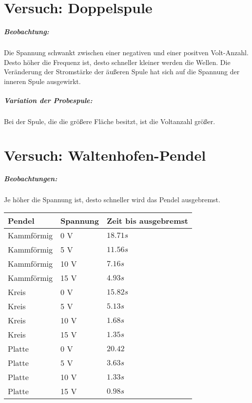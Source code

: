 \documentclass[a4paper, 12pt]{report}
\begin{document}
	\chapter{Versuch: Doppelspule}
	\paragraph{Beobachtung:}
	Die Spannung schwankt zwischen einer negativen und einer positven Volt-Anzahl.
	Desto höher die Frequenz ist, desto schneller kleiner werden die Wellen.
	Die Veränderung der Stromstärke der äußeren Spule hat sich auf die Spannung der inneren Spule ausgewirkt.
	\paragraph{Variation der Probespule:}
	Bei der Spule, die die größere Fläche besitzt, ist die Voltanzahl größer.
	\chapter{Versuch: Waltenhofen-Pendel}
	\paragraph{Beobachtungen:}
	Je höher die Spannung ist, desto schneller wird das Pendel ausgebremst.
	\\[0.6cm]
	\begin{tabularx}{\textwidth}{|X|X|X|}
		\hline
		\textbf{Pendel} & \textbf{Spannung} & \textbf{Zeit bis ausgebremst} \\
		\hline
		Kammförmig & 0 V & $18.71s$ \\
		\hline
		Kammförmig & 5 V & $11.56s$ \\
		\hline
		Kammförmig & 10 V & $7.16s$ \\
		\hline
		Kammförmig & 15 V & $4.93s$ \\
		\hline
		Kreis & 0 V & $15.82s$ \\
		\hline
		Kreis & 5 V & $5.13s$ \\
		\hline
		Kreis & 10 V & $1.68s$ \\
		\hline
		Kreis & 15 V & $1.35s$ \\
		\hline
		Platte & 0 V & $20.42$ \\
		\hline
		Platte & 5 V & $3.63s$ \\
		\hline
		Platte & 10 V & $1.33s$ \\
		\hline
		Platte & 15 V & $0.98s$ \\
		\hline
	\end{tabularx}
\end{document}
